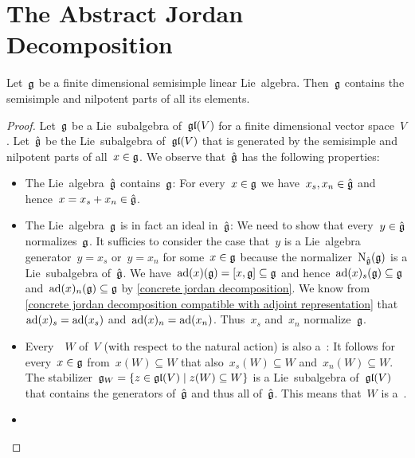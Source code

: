\section{The Abstract Jordan Decomposition}


\begin{lemma}
  \label{ss linear lie algebra contains ss and nilpotent parts}
 Let~$\glie$ be a finite dimensional semisimple linear Lie~algebra.
 Then~$\glie$ contains the semisimple and nilpotent parts of all its elements.
\end{lemma}


\begin{proof}
  Let~$\glie$ be a Lie~subalgebra of~$\mathfrak{gl}(V)$ for a finite dimensional vector space~$V$.
  Let~$\hat{\glie}$ be the Lie~subalgebra of~$\mathfrak{gl}(V)$ that is generated by the semisimple and nilpotent parts of all~$x \in \mathfrak{g}$.
  We observe that~$\hat{\glie}$ has the following properties:
  \begin{itemize}
    \item
      The Lie~algebra~$\hat{\glie}$ contains~$\glie$:
      For every~$x \in \mathfrak{g}$ we have~$x_s, x_n \in \hat{\mathfrak{g}}$ and hence~$x = x_s + x_n \in \hat{\mathfrak{g}}$.
    \item
      The Lie~algebra~$\glie$ is in fact an ideal in~$\hat{\glie}$:
      We need to show that every~$y \in \hat{\mathfrak{g}}$ normalizes~$\glie$.
      It sufficies to consider the case that~$y$ is a Lie~algebra generator~$y = x_s$ or~$y = x_n$ for some~$x \in \mathfrak{g}$ because the normalizer~$\operatorname{N}_{\hat{\mathfrak{g}}}(\mathfrak{g})$ is a Lie~subalgebra of~$\hat{\glie}$.
      We have~$\operatorname{ad}(x)(\mathfrak{g}) = [x,\mathfrak{g}] \subseteq \mathfrak{g}$ and hence~$\operatorname{ad}(x)_s(\mathfrak{g}) \subseteq \mathfrak{g}$ and~$\operatorname{ad}(x)_n(\mathfrak{g}) \subseteq \mathfrak{g}$ by \cref{concrete jordan decomposition}.
      We know from \cref{concrete jordan decomposition compatible with adjoint representation} that~$\operatorname{ad}(x)_s = \operatorname{ad}(x_s)$ and~$\operatorname{ad}(x)_n = \operatorname{ad}(x_n)$.
      Thus~$x_s$ and~$x_n$ normalize~$\glie$.
    \item
      Every~{\subrepresentation{$\glie$}}~$W$ of~$V$ (with respect to the natural action) is also a~{\subrepresentation{$\hat{\glie}$}}:
      It follows for every~$x \in \mathfrak{g}$ from~$x(W) \subseteq W$ that also~$x_s(W) \subseteq W$ and~$x_n(W) \subseteq W$.
      The stabilizer~$\glie_W = \{ z \in \gllie(V) \suchthat z(W) \subseteq W \}$ is a Lie~subalgebra of~$\mathfrak{gl}(V)$ that contains the generators of~$\hat{\glie}$ and thus all of~$\hat{\glie}$.
      This means that~$W$ is a~{\subrepresentation{$\hat{\glie}$}}.
    \item

\end{itemize}
\end{proof}
